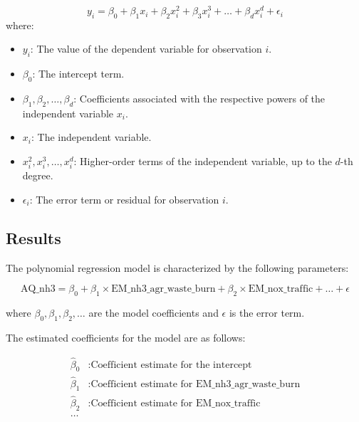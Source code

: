 \documentclass[10pt]{article} %
\begin{document}
    \begin{equation}
        y_i=\beta_0+\beta_1 x_i+\beta_2 x_i^2+\beta_3 x_i^3+\ldots+\beta_d x_i^d+\epsilon_i
        \label{eq:polynomial}
    \end{equation}
    where: 
    \begin{itemize}
        \item $y_i$: The value of the dependent variable for observation $i$.
        \item $\beta_0$: The intercept term.
        \item $\beta_1, \beta_2, \ldots, \beta_d$: Coefficients associated with the respective powers of the independent variable $x_i$.
        \item $x_i$: The independent variable.
        \item $x_i^2, x_i^3, \ldots, x_i^d$: Higher-order terms of the independent variable, up to the $d$-th degree.
        \item $\epsilon_i$: The error term or residual for observation $i$.
    \end{itemize}

    \subsection{Results}
    The polynomial regression model is characterized by the following parameters:

\begin{equation}
    \text{AQ\_nh3} = \beta_0 + \beta_1 \times \text{EM\_nh3\_agr\_waste\_burn} + \beta_2 \times \text{EM\_nox\_traffic} + \ldots + \epsilon
\end{equation}

where $\beta_0, \beta_1, \beta_2, \ldots$ are the model coefficients and $\epsilon$ is the error term.

The estimated coefficients for the model are as follows:

\begin{equation}
\begin{aligned}
    \hat{\beta}_0 & : \text{Coefficient estimate for the intercept} \\
    \hat{\beta}_1 & : \text{Coefficient estimate for } \text{EM\_nh3\_agr\_waste\_burn} \\
    \hat{\beta}_2 & : \text{Coefficient estimate for } \text{EM\_nox\_traffic} \\
    \ldots & \\
\end{aligned}
\end{equation}
\end{document}
